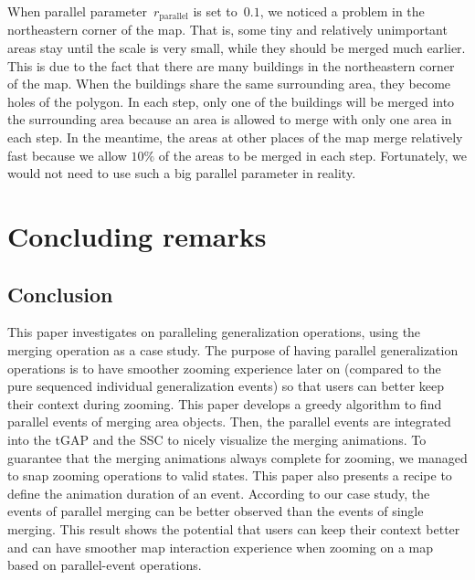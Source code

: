 \documentclass[]{interact}
\begin{document}
When parallel parameter~$r_\mathrm{parallel}$ is set to~$0.1$,
we noticed a problem in the northeastern corner of the map.
That is, some tiny and relatively unimportant areas stay 
until the scale is very small,
while they should be merged much earlier.
This is due to the fact that 
there are many buildings in the northeastern corner of the map.
When the buildings share the same surrounding area,
they become holes of the polygon.
In each step, only one of the buildings will be merged into the surrounding area
because an area is allowed to merge with only one area in each step.
In the meantime, the areas at other places of the map merge relatively fast
because we allow $10\%$ of the areas to be merged in each step.
Fortunately, we would not need to use such a big parallel parameter in reality.




\section{Concluding remarks}
\label{sec:concluding_remarks}

\subsection{Conclusion}
This paper investigates on paralleling generalization operations,
using the merging operation as a case study. 
The purpose of having parallel generalization operations 
is to have smoother zooming experience later on 
(compared to the pure sequenced individual generalization events)
so that users can better keep their context during zooming.
This paper develops a greedy algorithm to find parallel events of 
merging area objects.
Then, the parallel events are integrated into 
the tGAP and the SSC to nicely visualize the merging animations.
To guarantee that the merging animations always complete for zooming, 
we managed to snap zooming operations to valid states.
This paper also presents a recipe 
to define the animation duration of an event.
According to our case study,
the events of parallel merging 
can be better observed than the events of single merging.
This result shows the potential that
users can keep their context better 
and can have smoother map interaction experience
when zooming on a map based on parallel-event operations.
\end{document}
